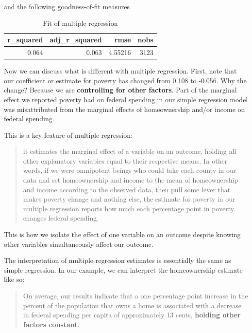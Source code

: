 \documentclass[
]{book}
\begin{document}
and the following goodness-of-fit measures

\begin{table}

\caption{\label{tab:multregexfit}Fit of multiple regression}
\centering
\begin{tabular}[t]{r|r|r|r}
\hline
r\_squared & adj\_r\_squared & rmse & nobs\\
\hline
0.064 & 0.063 & 4.55216 & 3123\\
\hline
\end{tabular}
\end{table}

Now we can discuss what is different with multiple regression. First, note that our coefficient or estimate for poverty has changed from 0.108 to -0.056. Why the change? Because we are \textbf{controlling for other factors}. Part of the marginal effect we reported poverty had on federal spending in our simple regression model was misattributed from the marginal effects of homeownership and/or income on federal spending.

This is a key feature of multiple regression:

\begin{quote}
it estimates the marginal effect of a variable on an outcome, holding all other explanatory variables equal to their respective means. In other words, if we were omnipotent beings who could take each county in our data and set homeownership and income to the mean of homeownership and income according to the observed data, then pull some lever that makes poverty change and nothing else, the estimate for poverty in our multiple regression reports how much each percentage point in poverty changes federal spending.
\end{quote}

This is how we isolate the effect of one variable on an outcome despite knowing other variables simultaneously affect our outcome.

The interpretation of multiple regression estimates is essentially the same as simple regression. In our example, we can interpret the homeownership estimate like so:

\begin{quote}
On average, our results indicate that a one percentage point increase in the percent of the population that owns a home is associated with a decrease in federal spending per capita of approximately 13 cents, \textbf{holding other factors constant}.
\end{quote}
\end{document}
